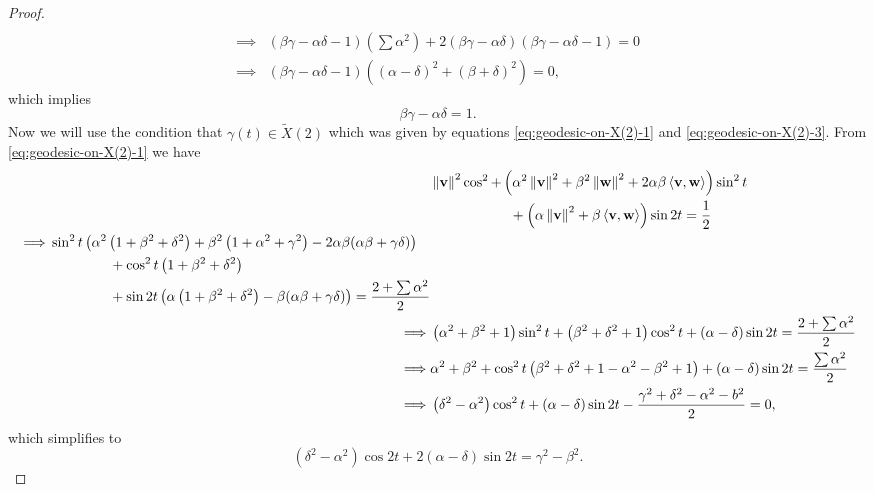 \begin{proof}
\begin{align*}
		\\
		\implies & (\beta \gamma-\alpha \delta-1)\left(\sum \alpha^2\right)+ 2(\beta \gamma-\alpha \delta)(\beta \gamma-\alpha \delta-1)=0 
		\\
		\implies & (\beta \gamma-\alpha \delta-1)\left((\alpha-\delta)^2+(\beta+\delta)^2\right)=0,
	\end{align*}
	which implies 
	\begin{equation}
		 \beta \gamma-\alpha \delta=1. \label{eq:ad-bc_cond}
	\end{equation}
	Now we will use the condition that $\gamma(t)\in \tilde{X}(2)$ which was given by equations \eqref{eq:geodesic-on-X(2)-1} and \eqref{eq:geodesic-on-X(2)-3}. From \eqref{eq:geodesic-on-X(2)-1} we have 
	\begin{align*}
		& \left\|\mathbf{v}\right\|^2\cos^2+ \left(\alpha^2 \left\|\mathbf{v}\right\|^2+\beta^2 \left\|\mathbf{w}\right\|^2+2 \alpha \beta \left\langle \mathbf{v},\mathbf{w} \right\rangle\right)\sin^2t \\
        & \kern 2cm + \left(\alpha \left\|\mathbf{v}\right\|^2+\beta \left\langle \mathbf{v},\mathbf{w} \right\rangle\right)\sin 2t = \frac{1}{2} 
		\\
		\begin{split}
			\implies & \sin^2t \left(\alpha^2 \left(1+\beta^2+\delta^2\right)+\beta^2 \left(1+\alpha^2+\gamma^2\right)-2 \alpha \beta(\alpha \beta +\gamma \delta)\right) \\ 
			& \kern 1.5cm 
			+ \cos^2t \left(1+\beta^2+\delta^2\right) \\
			& \kern 1.5cm  + \sin 2t \left(\alpha \left(1+\beta^2+\delta^2\right) -\beta(\alpha \beta+\gamma \delta)\right)= \frac{2+\sum \alpha^2}{2}
		\end{split}
		\\ 
		\implies & \left(\alpha^2+\beta^2+1\right)\sin^2t + \left(\beta^2+\delta^2+1\right)\cos^2t + (\alpha-\delta)\sin 2t= \frac{2+\sum \alpha^2}{2} 
		\\
		\implies & \alpha^2+\beta^2 + \cos^2t \left(\beta^2+\delta^2+1-\alpha^2-\beta^2+1\right)+ (\alpha-\delta)\sin 2t = \frac{\sum \alpha^2}{2} 
		\\
		\implies & \left(\delta^2-\alpha^2\right)\cos^2t + (\alpha-\delta)\sin 2t - \frac{\gamma^2+\delta^2-\alpha^2-b^2}{2}=0,
	\end{align*}
	which simplifies to 
	\begin{equation*}
		 \left(\delta^2-\alpha^2\right)\cos 2t + 2(\alpha-\delta)\sin 2t = \gamma^2-\beta^2 \label{eq:sin-cosine-rel-1}. 
	\end{equation*}

\end{proof}
